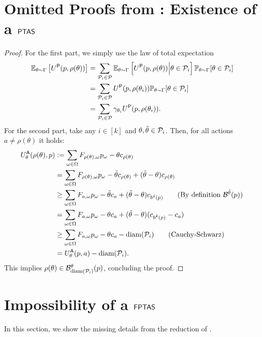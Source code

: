 \section{Omitted Proofs from : Existence of a $\textsf{PTAS}$}

\lemmadiscretization*

\begin{proof}
	For the first part, we simply use the law of total expectation 
	\begin{align*}
		\mathbb{E}_{\theta\sim\Gamma} \left[ U^\textsf{P}(p, \rho(\theta))\right] &= \sum_{\mathcal{P}_i\in\mathcal{P}}\mathbb{E}_{\theta\sim\Gamma} \left[ U^\textsf{P}(p, \rho(\theta))\Big\vert\theta\in\mathcal{P}_i\right]\mathbb{P}_{\theta\sim\Gamma}[\theta\in\mathcal{P}_i]\\
		&=\sum_{\mathcal{P}_i\in\mathcal{P}}U^\textsf{P}(p, \rho(\theta_i))\mathbb{P}_{\theta\sim\Gamma}[\theta\in\mathcal{P}_i]\\
		&=\sum_{\mathcal{P}_i\in\mathcal{P}}\gamma_{\theta_i}U^\textsf{P}(p, \rho(\theta_i)).
	\end{align*}
%
For the second part, take any $i\in[k]$ and $\theta,\tilde \theta\in \mathcal{P}_i$. Then, for all actions $a\neq \rho(\theta)$ it holds:
	\begin{align*}
		\Ua_{\theta}(\rho(\theta),p)&:=\sum_{\omega\in\Omega} F_{\rho(\theta),\omega}p_\omega-{ \theta c_{\rho(\theta)}} \\
		&= \sum_{\omega\in\Omega} F_{\rho(\theta),\omega}p_\omega- \tilde\theta c_{\rho(\theta)}+(\tilde\theta-\theta)c_{\rho(\theta)}\\
		&\ge \sum_{\omega\in\Omega} F_{a,\omega}p_\omega- \tilde\theta c_{a}+(\tilde\theta-\theta)c_{b^{\tilde\theta}(p)}\tag{By definition $\Bcal^{\tilde \theta}(p)$}\\
		&=\sum_{\omega\in\Omega} F_{a,\omega}p_\omega-{ \theta c_{a}}+(\tilde\theta-\theta)(c_{b^{\tilde\theta}(p)}-c_{a})\\
		&\ge \sum_{\omega\in\Omega} F_{a,\omega}p_\omega-{ \theta c_{a}} -\diam(\Pcal_i)\tag{Cauchy-Schwarz}\\
		&=\Ua_{\theta}(p,a)-\diam(\Pcal_i).
	\end{align*}
	This implies $\rho(\theta)\in\mathcal{B}_{\textnormal{diam}(\mathcal{P}_i)}^\theta(p)$, concluding the proof.
\end{proof}



\section{Impossibility of a $\textsf{FPTAS}$}\label{app:reduction}
In this section, we show the missing details from the reduction of .
